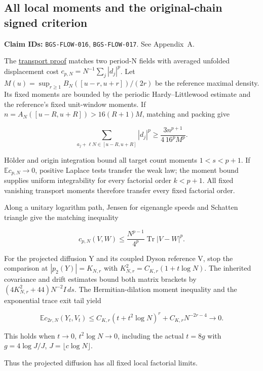\hypertarget{all-local-moments-and-the-original-chain-signed-criterion}{%
\subsection{All local moments and the original-chain signed criterion}\label{all-local-moments-and-the-original-chain-signed-criterion}}

\textbf{Claim IDs:} \texttt{BGS-FLOW-016}, \texttt{BGS-FLOW-017}. See Appendix~A.

\begin{theorem}\label{pass2:frontier-flow-016}

The
\href{https://github.com/ChurilovMaksim/BGS/blob/main/mathematics/local_moment_transport.md}{transport proof} matches two period-N fields
with averaged unfolded displacement cost
\(c_{p,N}=N^{-1}\sum_j|d_j|^p\). Let
\(M(u)=\sup_{r\ge1}B_N([u-r,u+r])/(2r)\) be the reference maximal density.
Its fixed moments are bounded by the periodic Hardy--Littlewood estimate
and the reference's fixed unit-window moments. If
\(n=A_N([u-R,u+R])>16(R+1)M\), matching and packing give

\[
\sum_{a_j+\ell N\in[u-R,u+R]}|d_j|^p
\ge\frac{3n^{p+1}}{4\,16^pM^p}.
\]

Hölder and origin integration bound all target count moments \(1<s<p+1\).
If \(\mathbb Ec_{p,N}\to0\), positive Laplace tests transfer the weak law;
the moment bound supplies uniform integrability for every factorial order
\(k<p+1\). All fixed vanishing transport moments therefore transfer every
fixed factorial order.

Along a unitary logarithm path, Jensen for eigenangle speeds and
Schatten triangle give the matching inequality

\[
c_{p,N}(V,W)\le\frac{N^{p-1}}{4^p}\operatorname{Tr}|V-W|^p.
\]

For the projected diffusion Y and its coupled Dyson reference V, stop the
comparison at \(|p_2(Y)|=K_{N,r}\) with
\(K_{N,r}^2=C_{K,r}(1+t\log N)\). The inherited covariance and drift
estimates bound both matrix brackets by
\((4K_{N,r}^2+44)N^{-2}I\,ds\). The Hermitian-dilation moment inequality
and the exponential trace exit tail yield

\[
\mathbb Ec_{2r,N}(Y_t,V_t)
\le C_{K,r}(t+t^2\log N)^r+C_{K,r}N^{-2r-4}\to0.
\]

This holds when \(t\to0\), \(t^2\log N\to0\), including the actual
\(t=8g\) with \(g=4\log J/J\), \(J=\lfloor c\log N\rfloor\).

Thus the projected diffusion has all fixed local factorial limits.

\end{theorem}


